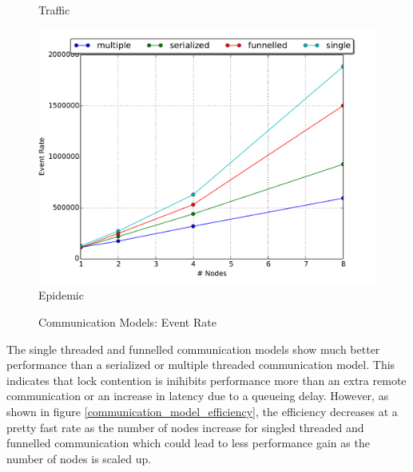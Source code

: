 \documentclass[11pt]{book}
\begin{document}
\begin{figure}
\begin{minipage}{.5\textwidth}
\begin{center}
      Traffic \\
    \end{center}
  \end{minipage}
  \centering
  \begin{minipage}{.5\textwidth}
    \begin{center}
      \includegraphics[width=\textwidth,keepaspectratio,quiet]{figs/partitioning_communication/communication_epidemic_eventrate.pdf} \\
      Epidemic \\
    \end{center}
  \end{minipage}
  \caption{Communication Models: Event Rate}\label{communication_model_eventrate}
\end{figure}

The single threaded and funnelled communication models show much better performance than a
serialized or multiple threaded communication model.  This indicates that lock contention
is inihibits performance more than an extra remote communication or an increase in latency due to
a queueing delay.  However, as shown in figure \ref{communication_model_efficiency}, the efficiency
decreases at a pretty fast rate as the number of nodes increase for singled threaded and funnelled
communication which could lead to less performance gain as the number of nodes is scaled up.
\end{document}
